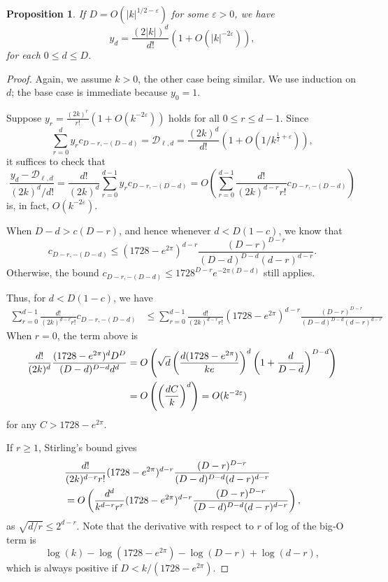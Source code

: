 \documentclass[12pt]{amsart}
\theoremstyle{plain} %
\newtheorem{proposition}[theorem]{Proposition}
\theoremstyle{definition}
\theoremstyle{remark}
\numberwithin{equation}{section}
\begin{document}
\begin{proposition}\label{p:faber-coefficients}
If $D=O(|k|^{1/2-\varepsilon})$ for some $\varepsilon>0$, we have
\[y_d=\frac{(2|k|)^d}{d!}\left(1+O(|k|^{-2 \varepsilon})\right),\]
for each $0\leq d\leq D$.
\end{proposition}
\begin{proof}
Again, we assume $k>0$, the other case being similar.
We use induction on $d$; the base case is immediate because $y_0=1$. 

Suppose $y_r=\frac{(2k)^r}{r!}\left(1+O(k^{-2
  \varepsilon})\right)$ holds for all $0\leq r\leq d-1$. Since
\begin{equation}\label{eq:faber}\sum_{r=0}^d y_r
c_{D-r,-(D-d)}=\mathcal{D}_{\ell,d}=\frac{(2k)^d}{d!}(1+O(1/k^{\frac{1}{2}+\varepsilon})),
\end{equation}
it suffices to check that 
\[\frac{y_d-\mathcal{D}_{\ell,d}}{(2k)^d/d!}=\frac{d!}{(2k)^d}\sum_{r=0}^{d-1}y_rc_{D-r,-(D-d)}=O\left(\sum_{r=0}^{d-1}\frac{d!}{(2k)^{d-r}r!}c_{D-r,-(D-d)}\right)\]
is, in fact, $O(k^{-2 \varepsilon})$.

When $D-d>c(D-r)$, and hence whenever $d<D(1-c)$, we know that 
\[c_{D-r,-(D-d)}\leq
(1728-e^{2\pi})^{d-r}\frac{(D-r)^{D-r}}{(D-d)^{D-d}(d-r)^{d-r}}.\]
Otherwise, the bound $c_{D-r,-(D-d)}\leq 1728^{D-r}e^{-2\pi(D-d)}$ still applies. 

Thus, for $d<D(1-c)$, we have
\begin{align*}
\sum_{r=0}^{d-1}\frac{d!}{(2k)^{d-r}r!}c_{D-r,-(D-d)}&\leq
                                                       \sum_{r=0}^{d-1}\frac{d!}{(2k)^{d-r}r!}(1728-e^{2\pi})^{d-r}\frac{(D-r)^{D-r}}{(D-d)^{D-d}(d-r)^{d-r}}
\end{align*}
When $r=0$, the term above is
\begin{align*}
\frac{d!}{(2k)^d}\frac{(1728-e^{2\pi})^dD^D}{(D-d)^{D-d}d^d} &=O
\left(\sqrt{d}\left(\frac{d(1728-e^{2\pi})}{ke}\right)^d
\left(1+\frac{d}{D-d}\right)^{D-d}\right) \notag \\
&=O\left(\left(\frac{dC}{k}\right)^d\right)=O(k^{-2 \varepsilon})
\end{align*}
for any $C>1728-e^{2\pi}$.

If $r\geq 1$, Stirling's bound gives
\begin{align*}
& \frac{d!}{(2k)^{d-r}r!}(1728-e^{2\pi})^{d-r}\frac{(D-r)^{D-r}}{(D-d)^{D-d}(d-r)^{d-r}} \notag \\
&=O\left(\frac{d^d}{k^{d-r}r^r}(1728-e^{2\pi})^{d-r}\frac{(D-r)^{D-r}}{(D-d)^{D-d}(d-r)^{d-r}}\right),
\end{align*}
as $\sqrt{d/r}\leq 2^{d-r}$.
Note that the derivative with respect to $r$ of log of the big‑O term is
\[ \log(k)-\log(1728-e^{2\pi})-\log(D-r)+\log(d-r),\] which is always
positive if $D<k/(1728-e^{2\pi})$.


\end{proof}
\end{document}
